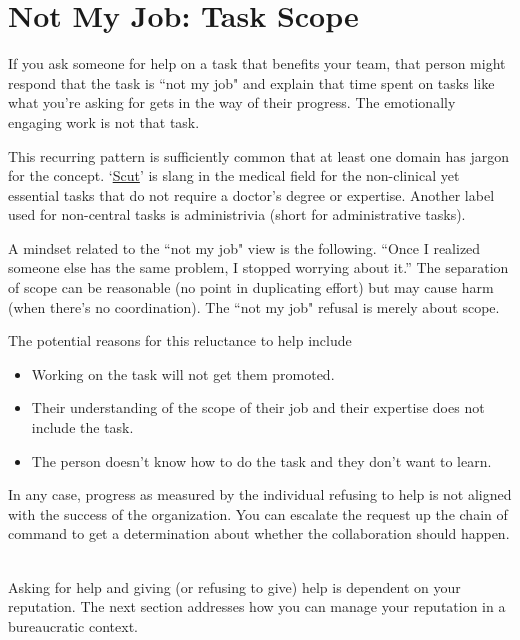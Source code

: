 \section{Not My Job: Task Scope}


If you ask someone for help on a task that benefits your team, that person might respond that the task is ``not my job" and explain that time spent on tasks like what you're asking for gets in the way of their progress. The emotionally engaging work is not that task.

This recurring pattern is sufficiently common that at least one domain has jargon for the concept.
`\href{https://www.urbandictionary.com/define.php?term=scut}{Scut}'\iftoggle{WPinmargin}{\marginpar{[Urbandictionary.com] scut}}{}
is  slang in the medical field for the non-clinical yet essential tasks that do not require a doctor's degree or expertise.
Another label used for non-central tasks is administrivia (short for administrative tasks).

A mindset related to the ``not my job" view is the following.
``Once I realized someone else has the same problem, I stopped worrying about it.'' The separation of scope can be reasonable (no point in duplicating effort) but may cause harm (when there's no coordination). The ``not my job" refusal is merely about scope. 

The potential reasons for this reluctance to help include
\begin{itemize}
    \item Working on the task will not get them promoted.
    \item Their understanding of the scope of their job and their expertise does not include the task.
    \item The person doesn't know how to do the task and they don't want to learn.
\end{itemize}
In any case, progress as measured by the individual refusing to help is not aligned with the success of the organization. You can escalate the request up the chain of command to get a determination about whether the collaboration should happen.

\ \\


Asking for help and giving (or refusing to give) help is dependent on your reputation.
The next section addresses how you can manage your reputation in a bureaucratic context.